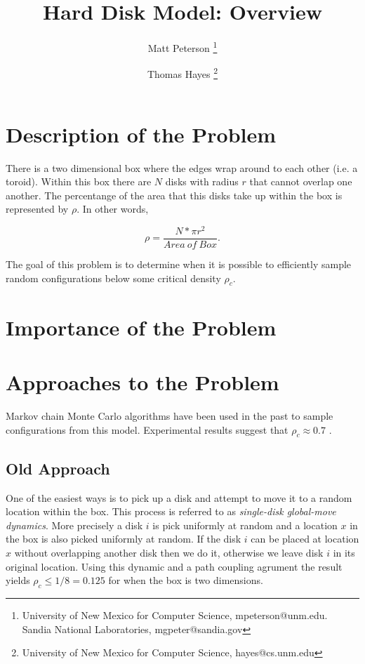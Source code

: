 \documentclass[a4paper,11pt]{article}
\title{Hard Disk Model: Overview}
\author{Matt Peterson \thanks{University of New Mexico for Computer Science, mpeterson@unm.edu. Sandia National Laboratories, mgpeter@sandia.gov} \and Thomas Hayes \thanks{University of New Mexico for Computer Science, hayes@cs.unm.edu}}
\begin{document}
\maketitle

\section*{Description of the Problem}
There is a two dimensional box where the edges wrap around to each other (i.e. a toroid).  Within this box there are $N$ disks with radius $r$ that cannot overlap one another.  The percentange of the area that this disks take up within the box is represented by $\rho$.  In other words,

\begin{displaymath}
  \rho = \frac{N*\pi r^2}{Area\ of\ Box}.
\end{displaymath}

The goal of this problem is to determine when it is possible to efficiently sample random configurations below some critical density $\rho_c$.

\section*{Importance of the Problem}

\section*{Approaches to the Problem}

Markov chain Monte Carlo algorithms have been used in the past to sample configurations from this model.  Experimental results suggest that $\rho_c \approx 0.7$ \cite{Mak}\cite{Piasecki}.

\subsection*{Old Approach}

One of the easiest ways is to pick up a disk and attempt to move it to a random location within the box.  This process is referred to as \textit{single-disk global-move dynamics}.  More precisely a disk $i$ is pick uniformly at random and a location $x$ in the box is also picked uniformly at random.  If the disk $i$ can be placed at location $x$ without overlapping another disk then we do it, otherwise we leave disk $i$ in its original location.  Using this dynamic and a path coupling agrument the result yields $\rho_c \le 1/8 = 0.125$ \cite{Kannan} for when the box is two dimensions.
\end{document}
